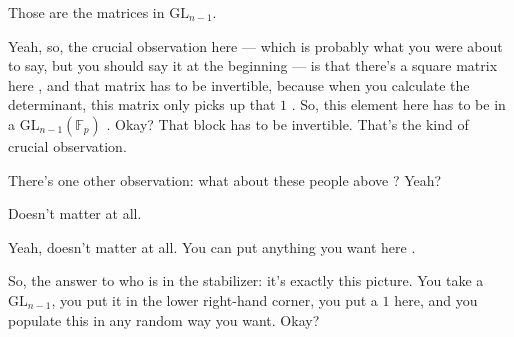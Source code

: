 \begin{student}
Those are the matrices in $\mathrm{GL}_{n-1}$.
\end{student}

\begin{speech}[01:17:16 - 01:17:41]
Yeah, so, the crucial observation here --- which is probably what you were about to say, but you should say it at the beginning --- is that there's a square matrix here , and that matrix has to be invertible, because when you calculate the determinant, this matrix only picks up that $1$ . So, this element here has to be in a $\mathrm{GL}_{n-1}(\mathbb{F}_p)$ . Okay? That block has to be invertible. That's the kind of crucial observation.

There's one other observation: what about these people above ? Yeah?
\end{speech}

\begin{student}
Doesn't matter at all.
\end{student}

\begin{speech}[01:17:43 - 01:18:02]
Yeah, doesn't matter at all. You can put anything you want here .

So, the answer to who is in the stabilizer: it's exactly this picture. You take a $\mathrm{GL}_{n-1}$, you put it in the lower right-hand corner, you put a $1$ here, and you populate this in any random way you want. Okay?
\end{speech}

